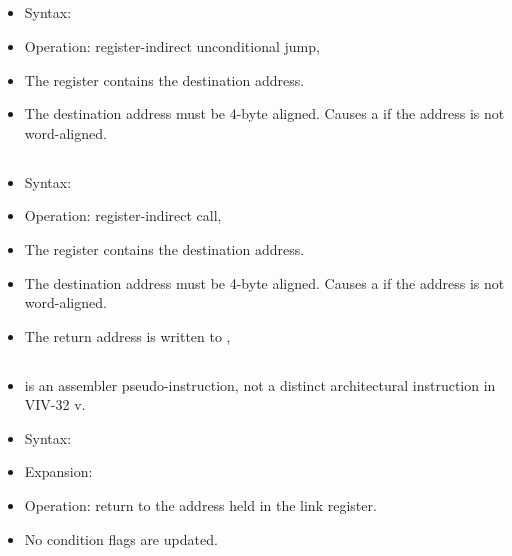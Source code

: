 \subsection{}

\begin{itemize}
\item Syntax: 
\item Operation: register-indirect unconditional jump,
\item The  register contains the destination address.
\item The destination address must be 4-byte aligned. Causes a
       if the  address is not
      word-aligned.
\end{itemize}

\subsection{}

\begin{itemize}
\item Syntax: 
\item Operation: register-indirect call, 
\item The  register contains the destination address.
\item The destination address must be 4-byte aligned. Causes a
       if the  address is not
      word-aligned.
\item The return address is written to , 
\end{itemize}

\subsection{}

\begin{itemize}
\item {} is an assembler pseudo-instruction, not a distinct
architectural instruction in VIV-32 v\version.
\item Syntax: 
\item Expansion: 
\item Operation: return to the address held in the link register.
\item No condition flags are updated.
\end{itemize}

